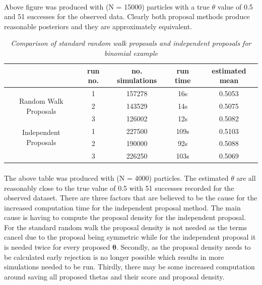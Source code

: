 \documentclass[12,fleqn]{article}
\theoremstyle{definition}
\theoremstyle{plain}
\begin{document}
\paragraph{}
Above figure was produced with (N = 15000) particles with a true $\theta$ value of 0.5 and 51 successes for the observed data. Clearly both proposal methods produce reasonable posteriors and they are approximately equivalent.
\par

\begin{table}[H]
\begin{center}
\begin{tabular} { | c | c | c | c | c | }
\hline
 & run no. & no. simulations  & run time & estimated mean \\
\hline
\multirow{3}{7em}{Random Walk Proposals} & 1 & 157278 & 16s  & 0.5053\\
 & 2 & 143529 & 14s & 0.5075\\
 & 3 & 126002 & 12s & 0.5082\\
\hline
\multirow{2}{7em}{Independent Proposals} & 1 & 227500 & 109s & 0.5103\\
 & 2 & 190000 & 92s & 0.5088\\
 & 3 & 226250 & 103s & 0.5069\\
\hline
\end{tabular}
\caption{\textit{Comparison of standard random walk proposals and independent proposals for binomial example}}
\end{center} 
\end{table}

\paragraph{}
The above table was produced with (N = 4000) particles. The estimated $\theta$ are all reasonably close to the true value of 0.5 with 51 successes recorded for the observed dataset. There are three factors that are believed to be the cause for the increased computation time for the independent proposal method. The main cause is having to compute the proposal density for the independent proposal. For the standard random walk the proposal density is not needed as the terms cancel due to the proposal being symmetric while for the independent proposal it is needed twice for every proposed $\boldsymbol{\theta}$. Secondly, as the proposal density needs to be calculated early rejection is no longer possible which results in more simulations needed to be run. Thirdly, there may be some increased computation around saving all proposed thetas and their score and proposal density. 
\par
%
\end{document}
